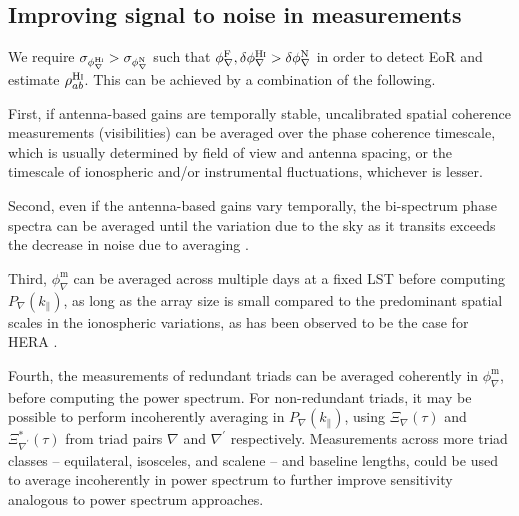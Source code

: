 \documentclass[
reprint,
superscriptaddress,
amsmath,
amssymb,
aps,
prd
]{revtex4-1}
\begin{document}
\subsection{Improving signal to noise in measurements}\label{sec:averaging}

We require $\sigma_{\phi_\nabla^\textrm{H{\sc i}}} > \sigma_{\phi_\nabla^\textrm{N}}$ such that $\phi_\nabla^\textrm{F}, \delta\phi_\nabla^\textrm{H{\sc i}} > \delta\phi_\nabla^\textrm{N}$ in order to detect EoR and estimate $\rho_{ab}^\textrm{H{\sc i}}$. This can be achieved by a combination of the following.


First, if antenna-based gains are temporally stable, uncalibrated spatial coherence measurements (visibilities) can be averaged over the phase coherence timescale, which is usually determined by field of view and antenna spacing, or the timescale of ionospheric and/or instrumental fluctuations, whichever is lesser. %

Second, even if the antenna-based gains vary temporally, the bi-spectrum phase spectra can be averaged until the variation due to the sky as it transits exceeds the decrease in noise due to averaging \cite{car18}. %

Third, $\phi_\nabla^\textrm{m}$ can be averaged across multiple days at a fixed LST before computing $P_\nabla(k_\parallel)$, as long as the array size is small compared to the predominant spatial scales in the ionospheric variations, as has been observed to be the case for HERA \cite{car18}. 

Fourth, the measurements of redundant triads can be averaged coherently in $\phi_\nabla^\textrm{m}$, before computing the power spectrum.  For non-redundant triads, it may be possible to perform incoherently averaging in $P_\nabla(k_\parallel)$, using  $\Xi_\nabla(\tau)$ and $\Xi_{\nabla^\prime}^*(\tau)$ from triad pairs $\nabla$ and $\nabla^\prime$ respectively. Measurements across more triad classes -- equilateral, isosceles, and scalene -- and baseline lengths, could be used to average incoherently in power spectrum to further improve sensitivity analogous to power spectrum approaches. 
\end{document}
